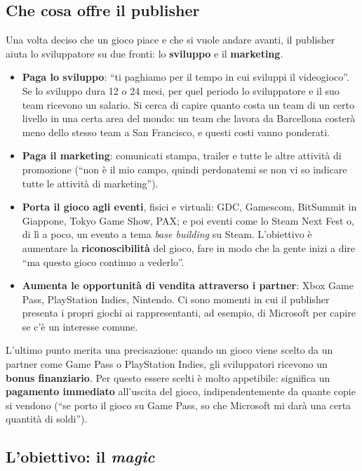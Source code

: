 \subsection{Che cosa offre il publisher}

Una volta deciso che un gioco piace e che si vuole andare avanti, il publisher
aiuta lo sviluppatore su due fronti: lo \textbf{sviluppo} e il
\textbf{marketing}.
\begin{itemize}
  \item \textbf{Paga lo sviluppo}: ``ti paghiamo per il tempo in cui sviluppi
        il videogioco''. Se lo sviluppo dura 12 o 24 mesi, per quel periodo lo
        sviluppatore e il suo team ricevono un salario. Si cerca di capire
        quanto costa un team di un certo livello in una certa area del mondo:
        un team che lavora da Barcellona costerà meno dello stesso team a San
        Francisco, e questi costi vanno ponderati.
  \item \textbf{Paga il marketing}: comunicati stampa, trailer e tutte le
        altre attività di promozione (``non è il mio campo, quindi perdonatemi
        se non vi so indicare tutte le attività di marketing'').
  \item \textbf{Porta il gioco agli eventi}, fisici e virtuali: GDC,
        Gamescom, BitSummit in Giappone, Tokyo Game Show, PAX; e poi eventi
        come lo Steam Next Fest o, di lì a poco, un evento a tema
        \emph{base building} su Steam. L'obiettivo è aumentare la
        \textbf{riconoscibilità} del gioco, fare in modo che la gente inizi a
        dire ``ma questo gioco continuo a vederlo''.
  \item \textbf{Aumenta le opportunità di vendita attraverso i partner}:
        Xbox Game Pass, PlayStation Indies, Nintendo. Ci sono momenti in cui il
        publisher presenta i propri giochi ai rappresentanti, ad esempio, di
        Microsoft per capire se c'è un interesse comune.
\end{itemize}

L'ultimo punto merita una precisazione: quando un gioco viene scelto da un
partner come Game Pass o PlayStation Indies, gli sviluppatori ricevono un
\textbf{bonus finanziario}. Per questo essere scelti è molto appetibile:
significa un \textbf{pagamento immediato} all'uscita del gioco,
indipendentemente da quante copie si vendono (``se porto il gioco su Game
Pass, so che Microsoft mi darà una certa quantità di soldi'').

\subsection{L'obiettivo: il \emph{magic}}

